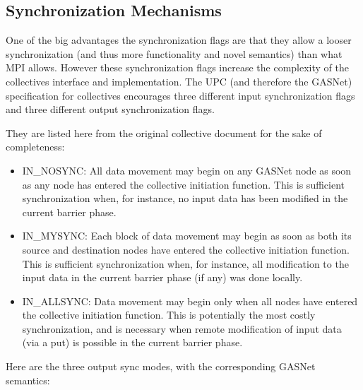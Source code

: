 \documentclass[times,10pt]{article}
\begin{document}
\newpage
\subsection{Synchronization Mechanisms}
One of the big advantages the synchronization flags are that they allow a looser synchronization (and thus more functionality and novel semantics) than what MPI allows. However these synchronization flags increase the complexity of the collectives interface and implementation. The UPC (and therefore the GASNet) specification for collectives encourages three different input synchronization flags and three different output synchronization flags. 

They are listed here from the original collective document for the sake of completeness:

\begin{itemize}
\item IN\_NOSYNC: All data movement may begin on any GASNet node as soon as
any node has entered the collective initiation function.  This is
sufficient synchronization when, for instance, no input data has been
modified in the current barrier phase.

\item IN\_MYSYNC: Each block of data movement may begin as soon as both its
source and destination nodes have entered the collective initiation
function.  This is sufficient synchronization when, for instance, all
modification to the input data in the current barrier phase (if any) was
done locally.

\item IN\_ALLSYNC: Data movement may begin only when all nodes have entered
the collective initiation function.  This is potentially the most costly
synchronization, and is necessary when remote modification of input
data (via a put) is possible in the current barrier phase.
\end{itemize}

Here are the three output sync modes, with the corresponding GASNet
semantics:
\end{document}
